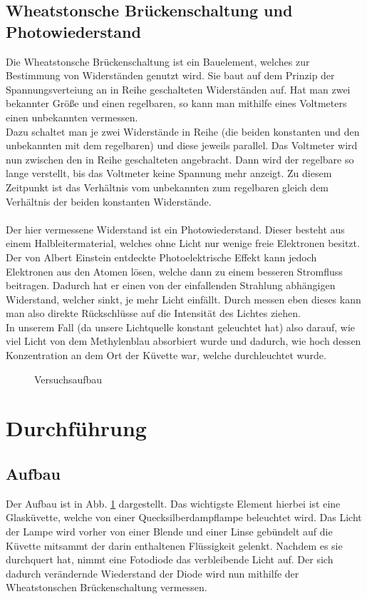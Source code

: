 \documentclass[12pt,a4paper,titlepage,headinclude,bibtotoc]{scrartcl}
\begin{document}
\subsection{Wheatstonsche Brückenschaltung und Photowiederstand}
Die Wheatstonsche Brückenschaltung ist ein Bauelement, welches zur Bestimmung von Widerständen genutzt wird.
Sie baut auf dem Prinzip der Spannungsverteiung an in Reihe geschalteten Widerständen auf.
Hat man zwei bekannter Größe und einen regelbaren, so kann man mithilfe eines Voltmeters einen unbekannten vermessen.\\
Dazu schaltet man je zwei Widerstände in Reihe (die beiden konstanten und den unbekannten mit dem regelbaren) und diese jeweils parallel.
Das Voltmeter wird nun zwischen den in Reihe geschalteten angebracht.
Dann wird der regelbare so lange verstellt, bis das Voltmeter keine Spannung mehr anzeigt.
Zu diesem Zeitpunkt ist das Verhältnis vom unbekannten zum regelbaren gleich dem Verhältnis der beiden konstanten Widerstände.\\\\
Der hier vermessene Widerstand ist ein Photowiederstand. 
Dieser besteht aus einem Halbleitermaterial, welches ohne Licht nur wenige freie Elektronen besitzt.
Der von Albert Einstein entdeckte Photoelektrische Effekt kann jedoch Elektronen aus den Atomen lösen, welche dann zu einem besseren Stromfluss beitragen.
Dadurch hat er einen von der einfallenden Strahlung abhängigen Widerstand, welcher sinkt, je mehr Licht einfällt.
Durch messen eben dieses kann man also direkte Rückschlüsse auf die Intensität des Lichtes ziehen.\\
In unserem Fall (da unsere Lichtquelle konstant geleuchtet hat) also darauf, wie viel Licht von dem Methylenblau absorbiert wurde und dadurch, wie hoch dessen Konzentration an dem Ort der Küvette war, welche durchleuchtet wurde.\\

\begin{figure}[!b]
 \centering
 \def\svgwidth{0.8\columnwidth}
 
 \caption{Versuchsaufbau\label{fig:aufbau}}
\end{figure}

\section{Durchführung}
\label{sec:durchfuehrung}
\subsection{Aufbau}
Der Aufbau ist in Abb. \ref{fig:aufbau} dargestellt.
Das wichtigste Element hierbei ist eine Glasküvette, welche von einer Quecksilberdampflampe beleuchtet wird.
Das Licht der Lampe wird vorher von einer Blende und einer Linse gebündelt auf die Küvette mitsammt der darin enthaltenen Flüssigkeit gelenkt.
Nachdem es sie durchquert hat, nimmt eine Fotodiode das verbleibende Licht auf.
Der sich dadurch verändernde Wiederstand der Diode wird nun mithilfe der Wheatstonschen Brückenschaltung vermessen.
\end{document}
